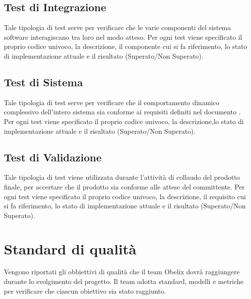 {

\subsection{Test di Integrazione}

Tale tipologia di test serve per verificare che le varie componenti
del sistema software interagiscano tra loro nel modo atteso. Per ogni
test viene specificato il proprio codice univoco, la descrizione, il
componente cui si fa riferimento, lo stato di implementazione attuale
e il risultato (Superato/Non Superato). 



\subsection{Test di Sistema}

Tale tipologia di test serve per verificare che il comportamento
dinamico complessivo dell'intero sistema sia conforme ai requisiti
definiti nel documento \analisideirequisiti. Per ogni test viene
specificato il proprio codice univoco, la descrizione,lo stato di
implementazione attuale e il risultato (Superato/Non Superato). 



\subsection{Test di Validazione}

Tale tipologia di test viene utilizzata durante l'attività di collaudo
del prodotto finale, per accertare che il prodotto sia conforme alle
attese del committente. Per ogni test viene specificato il proprio
codice univoco, la descrizione, il requisito cui si fa riferimento, lo
stato di implementazione attuale e il risultato (Superato/Non
Superato). 


  \clearpage


  \appendix


  \section{Standard di qualità}

  Vengono riportati gli obbiettivi di qualità che il team Obelix
  dovrà raggiungere durante lo svolgimento del progetto.  Il team
  adotta  standard, modelli e metriche per verificare che ciascun
  obiettivo sia stato raggiunto.


}
